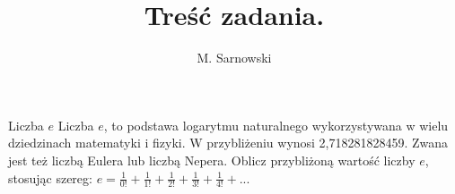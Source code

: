 \documentclass[a4paper,11pt]{article}
\author{M. Sarnowski}
\title{Treść zadania.}
\begin{document}
\maketitle
\begin{flushleft}
Liczba $e$
\newline
Liczba $e$, to podstawa logarytmu naturalnego wykorzystywana w wielu dziedzinach matematyki i fizyki. W przybliżeniu wynosi 2,718281828459.
\newline
\newline
Zwana jest też liczbą Eulera lub liczbą Nepera.
\newline
\newline
Oblicz przybliżoną wartość liczby $e$, stosując szereg:
\newline
\newline
$e = \frac{1}{0!} + \frac{1}{1!} + \frac{1}{2!} + \frac{1}{3!} + \frac{1}{4!} + ... $
\newline
\end{flushleft}
\end{document}
